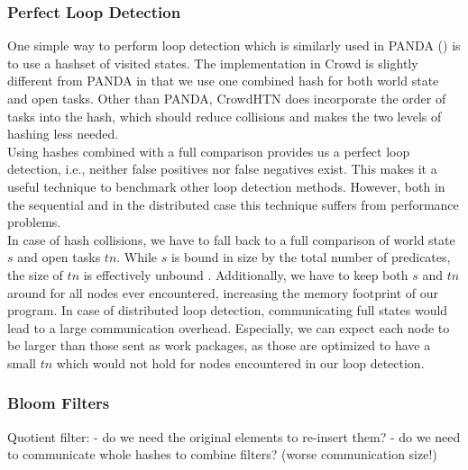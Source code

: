 \subsubsection{Perfect Loop Detection}
One simple way to perform loop detection which is similarly used in PANDA (\cite{holler2021loop}) is to use a hashset of visited states. The implementation in Crowd is slightly different from PANDA in that we use one combined hash for both world state and open tasks. Other than PANDA, CrowdHTN does incorporate the order of tasks into the hash, which should reduce collisions and makes the two levels of hashing less needed. \\
Using hashes combined with a full comparison provides us a perfect loop detection, i.e., neither false positives nor false negatives exist. This makes it a useful technique to benchmark other loop detection methods. However, both in the sequential and in the distributed case this technique suffers from performance problems. \\
In case of hash collisions, we have to fall back to a full comparison of world state $s$ and open tasks $tn$. While $s$ is bound in size by the total number of predicates, the size of $tn$ is effectively unbound . Additionally, we have to keep both $s$ and $tn$ around for all nodes ever encountered, increasing the memory footprint of our program.
In case of distributed loop detection, communicating full states would lead to a large communication overhead. Especially, we can expect each node to be larger than those sent as work packages, as those are optimized to have a small $tn$ which would not hold for nodes encountered in our loop detection.

\begin{comment}
	- Additionally, there is the full comparison for the world state
	- in practise this can be a problem, at the same time asymptotically it should not matter as it will be dwarfed by the 
	\todo{get some data on how many nodes share a world state on average as well as sizes of world states -> number of hash operations per world state!}
	- and the full comparison of open tasks
	- we cannot just free the open tasks and world state that are no longer needed! Both time and memory footprint are worse
	- worse memory and time complexity
	- however, it is a useful benchmark as to how many loops we *should* expect
\end{comment}

\subsubsection{Bloom Filters}
Quotient filter:
- do we need the original elements to re-insert them?
- do we need to communicate whole hashes to combine filters? (worse communication size!)


